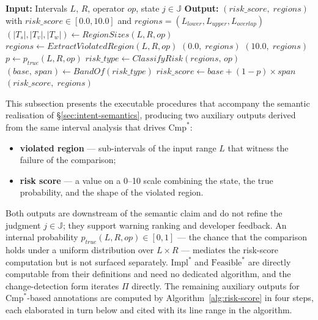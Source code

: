 \documentclass[pdflatex,sn-basic]{sn-jnl}%
\theoremstyle{thmstyleone}%
\theoremstyle{thmstyletwo}%
\theoremstyle{thmstylethree}%
\begin{document}
\begin{algorithm}[!t]
\caption{Auxiliary Outputs Computation for $\text{Cmp}^*$-based Annotations}
\label{alg:risk-score}
\begin{algorithmic}[1]
\State \textbf{Input:} Intervals $L$, $R$, operator $op$, state $j \in \mathbb{J}$
\State \textbf{Output:} $(\mathit{risk\_score},\; \mathit{regions})$ with $\mathit{risk\_score} \in [0.0, 10.0]$ and $\mathit{regions} = (L_{\mathit{lower}}, L_{\mathit{upper}}, L_{\mathit{overlap}})$
\State $(|T_s|, |T_v|, |T_w|) \gets \mathit{RegionSizes}(L, R, op)$
\State $\mathit{regions} \gets \mathit{ExtractViolatedRegion}(L, R, op)$
    \State \Return $(0.0,\; \mathit{regions})$
    \State \Return $(10.0,\; \mathit{regions})$
\EndIf
\State $p \gets p_{\mathit{true}}(L, R, op)$
\State $\mathit{risk\_type} \gets \mathit{ClassifyRisk}(\mathit{regions},\, op)$
\State $(\mathit{base},\, \mathit{span}) \gets \mathit{BandOf}(\mathit{risk\_type})$
\State $\mathit{risk\_score} \gets \mathit{base} + (1 - p) \times \mathit{span}$
\State \Return $(\mathit{risk\_score},\; \mathit{regions})$
\end{algorithmic}
\end{algorithm}

This subsection presents the executable procedures that accompany the semantic realisation of §\ref{sec:intent-semantics}, producing two auxiliary outputs derived from the same interval analysis that drives $\text{Cmp}^*$:
\begin{itemize}
    \item \textbf{violated region} --- sub-intervals of the input range $L$ that witness the failure of the comparison;
    \item \textbf{risk score} --- a value on a 0--10 scale combining the state, the true probability, and the shape of the violated region.
\end{itemize}

Both outputs are downstream of the semantic claim and do not refine the judgment $j \in \mathbb{J}$; they support warning ranking and developer feedback.
An internal probability $p_{\mathit{true}}(L, R, op) \in [0, 1]$ --- the chance that the comparison holds under a uniform distribution over $L \times R$ --- mediates the risk-score computation but is not surfaced separately.
$\text{Impl}^*$ and $\text{Feasible}^*$ are directly computable from their definitions and need no dedicated algorithm, and the change-detection form iterates $\Pi$ directly.
The remaining auxiliary outputs for $\text{Cmp}^*$-based annotations are computed by Algorithm~\ref{alg:risk-score} in four steps, each elaborated in turn below and cited with its line range in the algorithm.
\end{document}
